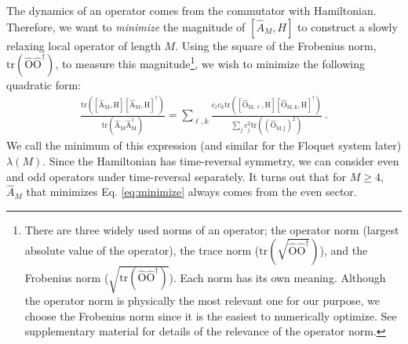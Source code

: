 \documentclass[twocolumn,superscriptaddress, prb]{revtex4-1}
\begin{document}
The dynamics of an operator comes from the commutator with Hamiltonian.
Therefore, we want to {\it minimize} the magnitude of $[\hat{A}_M, H]$
to construct a slowly relaxing local operator of length $M$.
Using the square of the Frobenius norm, $\mathrm{tr(\hat{O}\hat{O}^\dag)}$, to measure this magnitude\footnote{There are three widely used norms of an operator;
the operator norm (largest absolute value of the operator), the trace norm ($\mathrm{tr(\sqrt{\hat{O}\hat{O}^\dag})}$),
and the Frobenius norm ($\sqrt{\mathrm{tr(\hat{O}\hat{O}^\dag)}}$). Each norm has its own meaning.
Although the operator norm is physically the most relevant one for our purpose,
we choose the Frobenius norm since it is the easiest to numerically optimize.
See supplementary material for details of the relevance of the operator norm.},
we wish to minimize the following quadratic form:
\begin{align}\label{eq:minimize}
\frac{\mathrm{tr([\hat{A}_M,H][\hat{A}_M,H]^\dag)}}{\mathrm{tr(\hat{A}_M\hat{A}^\dag_M)}} = \sum_{\ell,k}\frac{c_\ell c_k \mathrm{tr([\hat{O}_{M,\ell},H][\hat{O}_{M,k},H]^\dag)}}{\sum_j c_j ^2 \mathrm{tr((\hat{O}_{M,j})^2)}} ~.
\end{align}
We call the minimum of this expression (and similar for the Floquet system later) $\lambda(M)$.
Since the Hamiltonian has time-reversal symmetry,
we can consider even and odd operators under time-reversal separately.
It turns out that for $M\geq 4$, $\hat{A}_M$ that minimizes Eq. \eqref{eq:minimize} always comes from the even sector.
\end{document}
